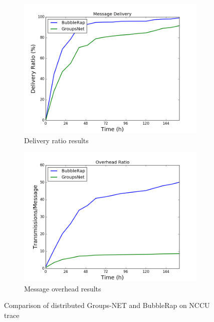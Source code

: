 \begin{figure}
    \begin{subfigure}[b]{0.5\columnwidth}
        \includegraphics[width=\linewidth]{imgs/groups-net/GroupsNet-delivery.png}
        \caption{Delivery ratio results}
        \label{fig:groupMessageDelivery}
    \end{subfigure}
    \hfill %
    \begin{subfigure}[b]{0.5\columnwidth}
        \includegraphics[width=\linewidth]{imgs/groups-net/GroupsNET-overhead.png}
        \caption{Message overhead results}
        \label{fig:groupOverhead}
    \end{subfigure}

    \caption{Comparison of distributed Groups-NET and BubbleRap on NCCU trace}
    \label{fig:groupSimulationResults}
\end{figure}
